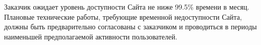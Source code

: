 
Заказчик ожидает уровень доступности Сайта не ниже 99.5\% времени в месяц. Плановые технические работы, требующие временной недоступности Сайта, должны быть предварительно согласованы с заказчиком и проводиться в периоды наименьшей предполагаемой активности пользователей.